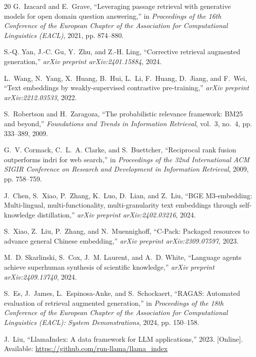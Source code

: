 \documentclass[10pt]{SPIIRAS_Proceedings}
\begin{document}
\begin{thebibliography}{20}
G.~Izacard and E.~Grave, ``Leveraging passage retrieval with generative models for open domain question answering,'' in \emph{Proceedings of the 16th Conference of the European Chapter of the Association for Computational Linguistics (EACL)}, 2021, pp. 874--880.

S.-Q. Yan, J.-C. Gu, Y.~Zhu, and Z.-H. Ling, ``Corrective retrieval augmented generation,'' \emph{arXiv preprint arXiv:2401.15884}, 2024.

L.~Wang, N.~Yang, X.~Huang, B.~Hui, L.~Li, F.~Huang, D.~Jiang, and F.~Wei, ``Text embeddings by weakly-supervised contrastive pre-training,'' \emph{arXiv preprint arXiv:2212.03533}, 2022.

S.~Robertson and H.~Zaragoza, ``The probabilistic relevance framework: BM25 and beyond,'' \emph{Foundations and Trends in Information Retrieval}, vol.~3, no.~4, pp. 333--389, 2009.

G.~V. Cormack, C.~L.~A. Clarke, and S.~Buettcher, ``Reciprocal rank fusion outperforms indri for web search,'' in \emph{Proceedings of the 32nd International ACM SIGIR Conference on Research and Development in Information Retrieval}, 2009, pp. 758--759.

J.~Chen, S.~Xiao, P.~Zhang, K.~Luo, D.~Lian, and Z.~Liu, ``BGE M3-embedding: Multi-lingual, multi-functionality, multi-granularity text embeddings through self-knowledge distillation,'' \emph{arXiv preprint arXiv:2402.03216}, 2024.

S.~Xiao, Z.~Liu, P.~Zhang, and N.~Muennighoff, ``C-Pack: Packaged resources to advance general Chinese embedding,'' \emph{arXiv preprint arXiv:2309.07597}, 2023.

M.~D. Skarlinski, S.~Cox, J.~M. Laurent, and A.~D. White, ``Language agents achieve superhuman synthesis of scientific knowledge,'' \emph{arXiv preprint arXiv:2409.13740}, 2024.

S.~Es, J.~James, L.~Espinosa-Anke, and S.~Schockaert, ``RAGAS: Automated evaluation of retrieval augmented generation,'' in \emph{Proceedings of the 18th Conference of the European Chapter of the Association for Computational Linguistics (EACL): System Demonstrations}, 2024, pp. 150--158.

J.~Liu, ``LlamaIndex: A data framework for LLM applications,'' 2023. [Online]. Available: \url{https://github.com/run-llama/llama_index}

\end{thebibliography}
\end{document}
